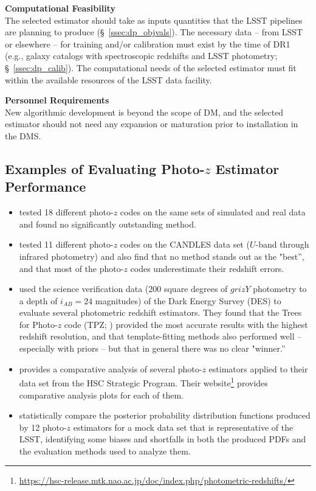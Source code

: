 \documentclass[DM,lsstdraft,toc]{lsstdoc}
\begin{document}
{\bf Computational Feasibility}\\
The selected estimator should take as inputs quantities that the LSST pipelines are planning to produce (\S~\ref{ssec:dp_objvals}).
The necessary data -- from LSST or elsewhere -- for training and/or calibration must exist by the time of DR1 (e.g., galaxy catalogs with spectroscopic redshifts and LSST photometry; \S~\ref{ssec:dp_calib}).
The computational needs of the selected estimator must fit within the available resources of the LSST data facility.

{\bf Personnel Requirements}\\
New algorithmic development is beyond the scope of DM, and the selected estimator should not need any expansion or maturation prior to installation in the DMS.


\subsection{Examples of Evaluating Photo-$z$ Estimator Performance}\label{ssec:sel_eval}

\begin{itemize}
\item \citet{2010A&A...523A..31H} tested 18 different photo-$z$ codes on the same sets of simulated and real data and found no significantly outstanding method.
\item \citet{2013ApJ...775...93D} tested 11 different photo-$z$ codes on the CANDLES data set ($U$-band through infrared photometry) and also find that no method stands out as the "best'', and that most of the photo-$z$ codes underestimate their redshift errors.
\item \citet{2014MNRAS.445.1482S} used the science verification data (200 square degrees of $grizY$ photometry to a depth of $i_{AB}=24$ magnitudes) of the Dark Energy Survey (DES) to evaluate several photometric redshift estimators. They found that the Trees for Photo-$z$ code (TPZ; \citet{2013ascl.soft04011C}) provided the most accurate results with the highest redshift resolution, and that template-fitting methods also performed well -- especially with priors -- but that in general there was no clear "winner.''
\item \citet{2018PASJ...70S...9T} provides a comparative analysis of several photo-$z$ estimators applied to their data set from the HSC Strategic Program. Their website\footnote{\url{https://hsc-release.mtk.nao.ac.jp/doc/index.php/photometric-redshifts/}} provides comparative analysis plots for each of them.
\item \citet{2020arXiv200103621S} statistically compare the posterior probability distribution functions produced by 12 photo-$z$ estimators for a mock data set that is representative of the LSST, identifying some biases and shortfalls in both the produced PDFs and the evaluation methods used to analyze them.
\end{itemize}
\end{document}
